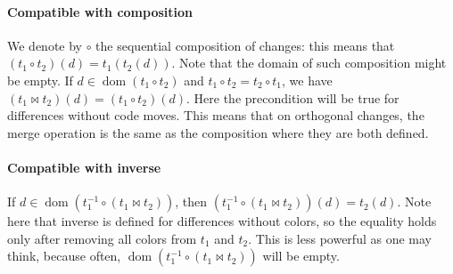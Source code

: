 \documentclass[a4paper,11pt]{article}
\newcommand\merge{\mathbin{\Join}}
\DeclareMathOperator\dom{dom}
\begin{document}
\paragraph{Compatible with composition}
We denote by $\circ$ the sequential composition of changes: this means that
$(t_1 \circ t_2)(d) = t_1(t_2(d))$. Note that the domain of such composition
might be empty.
If $d \in \dom(t_1 \circ t_2)$ and $t_1 \circ t_2 = t_2 \circ
t_1$, we have $(t_1 \merge t_2)(d) = (t_1 \circ t_2)(d)$. Here the
precondition will be true for differences without code moves. This
means that on orthogonal changes, the merge operation is the same as
the composition where they are both defined.

\paragraph{Compatible with inverse}
If $d \in \dom(t_1^{-1} \circ (t_1 \merge t_2))$, then $(t_1^{-1}
\circ (t_1 \merge t_2))(d) = t_2(d)$. Note here that inverse is
defined for differences without colors, so the equality holds only
after removing all colors from $t_1$ and $t_2$. This is less powerful as one may
think, because often, $\dom(t_1^{-1} \circ (t_1 \merge t_2))$ will be empty.
\end{document}

